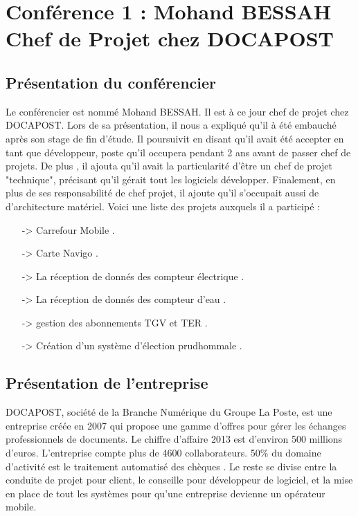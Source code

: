  \section{Conférence 1 : Mohand BESSAH Chef de Projet chez DOCAPOST}
 
 
 \subsection{Présentation du conférencier}
 Le conférencier est  nommé Mohand BESSAH. Il est à ce jour chef de projet chez DOCAPOST. Lors de sa présentation, il nous a expliqué qu'il à été embauché après son stage de fin d'étude. Il poursuivit en disant qu'il avait été accepter en tant que développeur, poste qu'il occupera pendant 2 ans avant de passer chef de projets. De plus , il ajouta qu'il avait la particularité d'être un chef de projet "technique", précisant qu'il gérait tout les logiciels développer. Finalement, en plus de ses responsabilité de chef projet, il ajoute qu'il s'occupait aussi de d'architecture matériel.
 Voici une liste des projets auxquels il a participé :
 \begin{itemize}
 	\item[->] Carrefour Mobile .
 	\item[->] Carte Navigo .
 	\item[->] La réception de donnés des compteur électrique .
 	\item[->] La réception de donnés des compteur d'eau .
 	\item[->] gestion des abonnements TGV et TER .
 	\item[->] Création d'un système d'élection prudhommale .
 \end{itemize}
 \subsection{Présentation de l'entreprise}
 DOCAPOST, société de la Branche Numérique du Groupe La Poste, est une entreprise créée en 2007 qui propose une gamme d'offres pour gérer les échanges professionnels de documents. Le chiffre d'affaire 2013 est d'environ 500 millions d'euros. L'entreprise compte plus de 4600 collaborateurs. 50\% du domaine d'activité est le traitement automatisé des chèques . Le reste se divise entre la conduite de projet pour client, le conseille pour développeur de logiciel, et la mise en place de tout les systèmes pour qu'une entreprise devienne un opérateur mobile.
 
